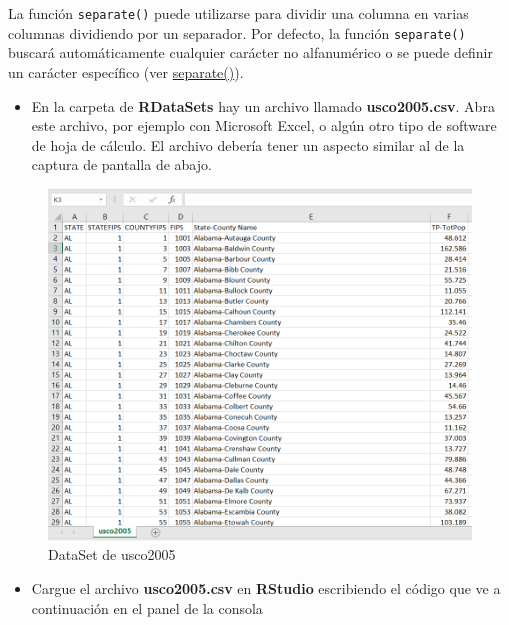 \documentclass[
]{book}
\providecommand{\tightlist}{%
  \setlength{\itemsep}{0pt}\setlength{\parskip}{0pt}}
\begin{document}
La función \texttt{separate()} puede utilizarse para dividir una columna en varias columnas dividiendo por un separador. Por defecto, la función \texttt{separate()} buscará automáticamente cualquier carácter no alfanumérico o se puede definir un carácter específico (ver \href{https://www.rdocumentation.org/packages/tidyr/versions/1.3.0/topics/separate}{separate()}).

\begin{itemize}
\tightlist
\item
  En la carpeta de \textbf{RDataSets} hay un archivo llamado \textbf{usco2005.csv}. Abra este archivo, por ejemplo con Microsoft Excel, o algún otro tipo de software de hoja de cálculo. El archivo debería tener un aspecto similar al de la captura de pantalla de abajo.
\end{itemize}

\begin{figure}

{\centering \includegraphics[width=1\linewidth]{images/figura7} 

}

\caption{DataSet de usco2005}\label{fig:figura7}
\end{figure}

\begin{itemize}
\tightlist
\item
  Cargue el archivo \textbf{usco2005.csv} en \textbf{RStudio} escribiendo el código que ve a continuación en el panel de la consola
\end{itemize}
\end{document}
